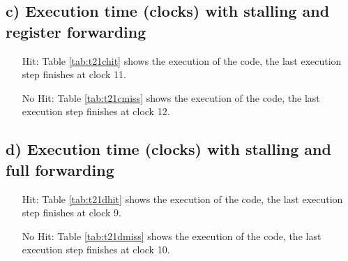 \subsection{c) Execution time (clocks) with stalling and register forwarding}
\begin{itemize}
    \item[Hit: ] Table \ref{tab:t21chit} shows  the execution of the code, the
    last execution step finishes at clock 11.

    \item[No Hit: ] Table \ref{tab:t21cmiss} shows  the execution of the code, the
    last execution step finishes at clock 12.
\end{itemize}

\subsection{d) Execution time (clocks) with stalling and full forwarding}
\begin{itemize}
    \item[Hit: ] Table \ref{tab:t21dhit} shows  the execution of the code, the
    last execution step finishes at clock 9.

    \item[No Hit: ] Table \ref{tab:t21dmiss} shows  the execution of the code, the
    last execution step finishes at clock 10.
\end{itemize}




